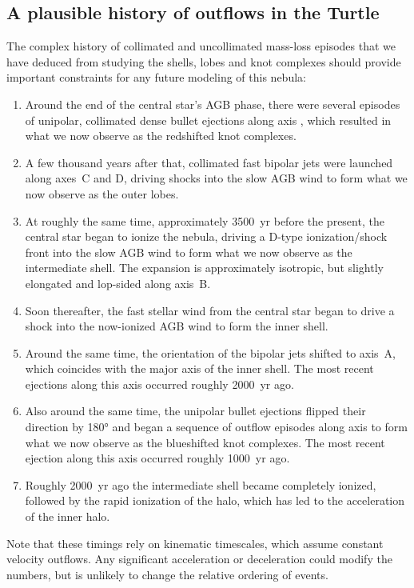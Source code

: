 \documentclass[useAMS, usenatbib]{mnras}
\begin{document}
\subsection{A plausible history of outflows in the Turtle}
\label{sec:poss-hist-outfl}

The complex history of collimated and uncollimated mass-loss episodes
that we have deduced from studying the shells, lobes and knot complexes
should provide important constraints for any future modeling of this nebula:
\begin{enumerate}[1.]
\item Around the end of the central star's AGB phase,
  there were several episodes of unipolar, collimated dense bullet ejections
  along axis ,
  which resulted in what we now observe as the redshifted knot complexes. 
\item A few thousand years after that,
  collimated fast bipolar jets were launched along axes~C and D,
  driving shocks into the slow AGB wind to form what we now observe as the outer lobes.
\item At roughly the same time, approximately \SI{3500}{yr} before the present,
  the central star began to ionize the nebula,
  driving a D-type ionization/shock front into the slow AGB wind
  to form what we now observe as the intermediate shell.
  The expansion is approximately isotropic,
  but slightly elongated and lop-sided along axis~B. 
\item Soon thereafter,
  the fast stellar wind from the central star
  began to drive a shock into the now-ionized AGB wind
  to form the inner shell.
\item Around the same time, the orientation of the bipolar jets shifted to axis~A,
  which coincides with the major axis of the inner shell.
  The most recent ejections along this axis occurred roughly \SI{2000}{yr} ago.
\item Also around the same time,
  the unipolar bullet ejections flipped their direction by \ang{180}
  and began a sequence of outflow episodes along axis 
  to form what we now observe as the blueshifted knot complexes.
  The most recent ejection along this axis occurred roughly \SI{1000}{yr} ago.
\item Roughly \SI{2000}{yr} ago the intermediate shell became completely ionized,
  followed by the rapid ionization of the halo,
  which has led to the acceleration of the inner halo.
\end{enumerate}
Note that these timings rely on kinematic timescales,
which assume constant velocity outflows.
Any significant acceleration or deceleration could modify the numbers,
but is unlikely to change the relative ordering of events.
\end{document}
